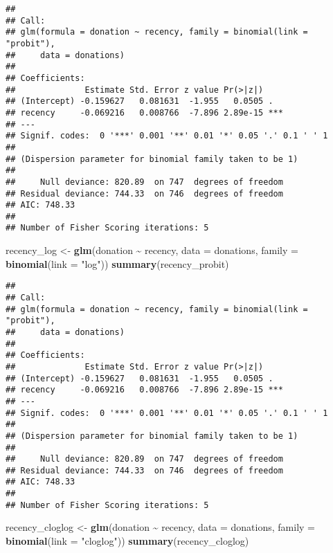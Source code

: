 \documentclass[
]{article}
\newenvironment{Shaded}{\begin{snugshade}}{\end{snugshade}}
\newcommand{\AttributeTok}[1]{\textcolor[rgb]{0.13,0.29,0.53}{#1}}
\newcommand{\FunctionTok}[1]{\textcolor[rgb]{0.13,0.29,0.53}{\textbf{#1}}}
\newcommand{\NormalTok}[1]{#1}
\newcommand{\OtherTok}[1]{\textcolor[rgb]{0.56,0.35,0.01}{#1}}
\newcommand{\SpecialCharTok}[1]{\textcolor[rgb]{0.81,0.36,0.00}{\textbf{#1}}}
\newcommand{\StringTok}[1]{\textcolor[rgb]{0.31,0.60,0.02}{#1}}
\begin{document}
\begin{verbatim}
## 
## Call:
## glm(formula = donation ~ recency, family = binomial(link = "probit"), 
##     data = donations)
## 
## Coefficients:
##              Estimate Std. Error z value Pr(>|z|)    
## (Intercept) -0.159627   0.081631  -1.955   0.0505 .  
## recency     -0.069216   0.008766  -7.896 2.89e-15 ***
## ---
## Signif. codes:  0 '***' 0.001 '**' 0.01 '*' 0.05 '.' 0.1 ' ' 1
## 
## (Dispersion parameter for binomial family taken to be 1)
## 
##     Null deviance: 820.89  on 747  degrees of freedom
## Residual deviance: 744.33  on 746  degrees of freedom
## AIC: 748.33
## 
## Number of Fisher Scoring iterations: 5
\end{verbatim}

\begin{Shaded}
\begin{Highlighting}[]
\NormalTok{recency\_log }\OtherTok{\textless{}{-}} \FunctionTok{glm}\NormalTok{(donation }\SpecialCharTok{\textasciitilde{}}\NormalTok{ recency, }\AttributeTok{data =}\NormalTok{ donations, }\AttributeTok{family =} \FunctionTok{binomial}\NormalTok{(}\AttributeTok{link =} \StringTok{"log"}\NormalTok{))}
\FunctionTok{summary}\NormalTok{(recency\_probit)}
\end{Highlighting}
\end{Shaded}

\begin{verbatim}
## 
## Call:
## glm(formula = donation ~ recency, family = binomial(link = "probit"), 
##     data = donations)
## 
## Coefficients:
##              Estimate Std. Error z value Pr(>|z|)    
## (Intercept) -0.159627   0.081631  -1.955   0.0505 .  
## recency     -0.069216   0.008766  -7.896 2.89e-15 ***
## ---
## Signif. codes:  0 '***' 0.001 '**' 0.01 '*' 0.05 '.' 0.1 ' ' 1
## 
## (Dispersion parameter for binomial family taken to be 1)
## 
##     Null deviance: 820.89  on 747  degrees of freedom
## Residual deviance: 744.33  on 746  degrees of freedom
## AIC: 748.33
## 
## Number of Fisher Scoring iterations: 5
\end{verbatim}

\begin{Shaded}
\begin{Highlighting}[]
\NormalTok{recency\_cloglog }\OtherTok{\textless{}{-}} \FunctionTok{glm}\NormalTok{(donation }\SpecialCharTok{\textasciitilde{}}\NormalTok{ recency, }\AttributeTok{data =}\NormalTok{ donations, }\AttributeTok{family =} \FunctionTok{binomial}\NormalTok{(}\AttributeTok{link =} \StringTok{"cloglog"}\NormalTok{))}
\FunctionTok{summary}\NormalTok{(recency\_cloglog)}
\end{Highlighting}
\end{Shaded}
\end{document}
